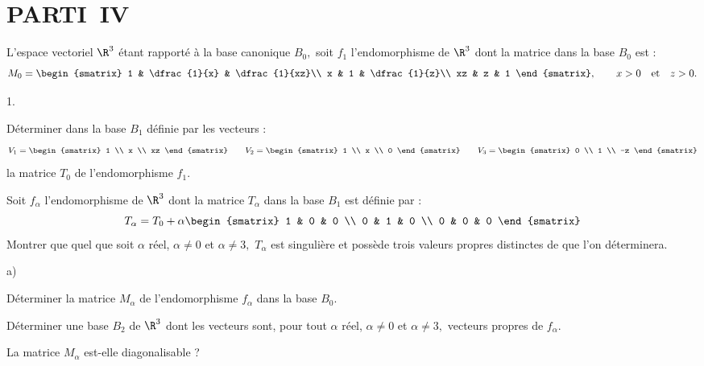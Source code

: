 \documentclass[11pt]{article}%
\begin{document}
\section*{PARTI\E\ IV}

L'espace vectoriel $\R^{3}$ étant rapporté à la base canonique $B_{0},$
soit $f_{1}$ l'endomorphisme de $\R^{3}$ dont la matrice
dans la base $B_{0}$ est :
\[
M_{0} = 
\begin{smatrix}
1 & \dfrac{1}{x} & \dfrac{1}{xz}\\
x & 1 & \dfrac{1}{z}\\
xz & z & 1
\end{smatrix},\qquad x>0\quad \text{et}\quad z>0.
\]

\begin{noliste}{1.}
 \setlength{\itemsep}{4mm}
\item Déterminer dans la base $B_{1}$ définie par les vecteurs :
\[
V_{1} = 
\begin{smatrix}
1 \\
x \\
xz
\end{smatrix}
\qquad V_{2} = 
\begin{smatrix}
1 \\
x \\
0
\end{smatrix}
\qquad V_{3} = 
\begin{smatrix}
0 \\
1 \\
-z
\end{smatrix}
\]
la matrice $T_{0}$ de l'endomorphisme $f_{1}.$

\item Soit $f_{\alpha }$ l'endomorphisme de $\R^{3}$ dont la matrice 
$T_{\alpha }$ dans la base $B_{1}$ est définie par :
\[
T_{\alpha } = T_{0} + \alpha 
\begin{smatrix}
1 & 0 & 0 \\
0 & 1 & 0 \\
0 & 0 & 0
\end{smatrix}
\]
Montrer que quel que soit $\alpha $ réel, $\alpha \neq 0$ et $\alpha
\neq 3,$
$T_{\alpha }$ est singulière et possède trois valeurs propres
distinctes de
que l'on déterminera.

\item 

\begin{noliste}{a)}
 \setlength{\itemsep}{2mm}
\item Déterminer la matrice $M_{\alpha }$ de l'endomorphisme $f_{\alpha
}$
dans la base $B_{0}.$

\item Déterminer une base $B_{2}$ de $\R^{3}$ dont les vecteurs
sont, pour tout $\alpha $ réel, $\alpha \neq 0$ et $\alpha \neq 3,$
vecteurs
propres de $f_{\alpha }$.

\item La matrice $M_{\alpha }$ est-elle diagonalisable ?
\end{noliste}
\end{noliste}

\label{fin}
\end{document}
